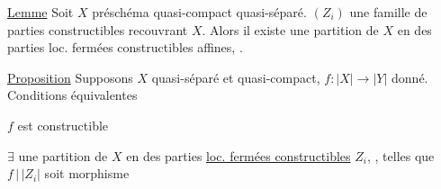 \uline{Lemme} Soit $X$ préschéma quasi-compact quasi-séparé.  $(Z_i)$ une famille  de parties constructibles recouvrant $X$. Alors il existe une partition de $X$ en des parties loc. fermées constructibles affines, .

\uline{Proposition} Supposons $X$ quasi-séparé et quasi-compact, $f:|X|\longrightarrow|Y|$ donné. Conditions équivalentes

 $f$ est constructible

 $\exists$ une partition  de $X$ en des parties \uline{loc. fermées constructibles} $Z_i$, , telles que $f\,|\,|Z_i|$ soit morphisme

